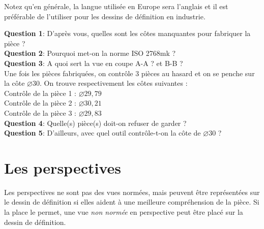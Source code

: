 \documentclass[
	11pt, %
	fleqn, %
	a4paper, %
]{LegrandOrangeBook}
\begin{document}
\begin{remark}
Notez qu'en générale, la langue utilisée en Europe sera l'anglais et il est préférable de l'utiliser pour les dessins de définition en industrie.
\end{remark}

\begin{tcolorbox}[colback=gray!5!white,colframe=gray!75!ocre,title=Entrainement]

\textbf{Question 1}: D'après vous, quelles sont les côtes manquantes pour fabriquer la pièce ?\\

\textbf{Question 2}: Pourquoi met-on la norme ISO 2768mk ?\\

\textbf{Question 3}: A quoi sert la vue en coupe A-A ? et B-B ?\\

Une fois les pièces fabriquées, on contrôle 3 pièces au hasard et on se penche sur la côte $\varnothing 30$. On trouve respectivement les côtes suivantes : \\

Contrôle de la pièce 1 : $\varnothing 29,79$ \\
Contrôle de la pièce 2 : $\varnothing 30,21$ \\
Contrôle de la pièce 3 : $\varnothing 29,83$ \\

\textbf{Question 4}: Quelle(s) pièce(s) doit-on refuser de garder ? \\

\textbf{Question 5}: D'ailleurs, avec quel outil contrôle-t-on la côte de $\varnothing 30$ ?


\end{tcolorbox}



\section{Les perspectives}
Les perspectives ne sont pas des vues normées, mais peuvent être représentées sur le dessin de définition si elles aident à une meilleure compréhension de la pièce. Si la place le permet, une vue \textit{non normée} en perspective peut être placé sur la dessin de définition.
\end{document}
